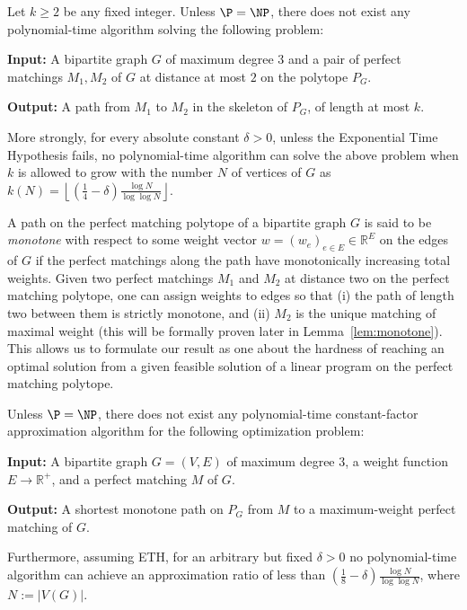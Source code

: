 \documentclass[runningheads]{llncs}
\begin{document}
\begin{theorem}
  \label{thm:approxdistanceishard}
  Let $k \ge 2$ be any fixed integer.
  Unless $\P=\NP$, there does not exist any polynomial-time algorithm solving the following problem: 
  \begin{description}
  \item{\textbf{Input:}} A bipartite graph $G$ of maximum degree $3$ and a pair of perfect matchings $M_1, M_2$ of $G$ at distance at most $2$ on the polytope $P_G$.
  \item{\textbf{Output:}} A path from $M_1$ to $M_2$ in the skeleton of $P_G$, of length at most $k$.
  \end{description}

More strongly, for every absolute constant $\delta>0$, unless the Exponential Time Hypothesis fails, no polynomial-time algorithm can solve the above problem when $k$ is allowed to grow with the number $N$ of vertices of $G$ as $k(N)=\left\lfloor \left(\frac{1}{4}-\delta\right)\frac{\log N}{\log \log N} \right\rfloor$. 
\end{theorem}

A path on the perfect matching polytope of a bipartite graph $G$ is said to be \emph{monotone} with respect to some weight vector $w=(w_e)_{e \in E} \in \mathbb{R}^E$ on the edges of $G$ if the perfect matchings along the path have monotonically increasing total weights. Given two perfect matchings $M_1$ and $M_2$ at distance two on the perfect matching polytope, one can assign weights to edges so that (i) the path of length two between them is strictly monotone, and (ii) $M_2$ is the unique matching of maximal weight (this will be formally proven later in Lemma~\ref{lem:monotone}). This allows us to formulate our result as one about the hardness of reaching an optimal solution from a given feasible solution of a linear program on the perfect matching polytope.

\begin{corollary}
  \label{cor:monotone}
  Unless $\P=\NP$, there does not exist any polynomial-time constant-factor approximation algorithm for the following optimization problem: 
\begin{description}
\item{\textbf{Input:}} A bipartite graph $G=(V,E)$ of maximum degree $3$, a weight function $E\to\mathbb{R}^+$, and a perfect matching $M$ of $G$.
\item{\textbf{Output:}} A shortest monotone path on $P_G$ from $M$ to a maximum-weight perfect matching of $G$.
\end{description}

 Furthermore, assuming ETH, for an arbitrary but fixed $\delta>0$ no polynomial-time algorithm can achieve an approximation ratio of less than $\left(\frac{1}{8}-\delta\right)\frac{\log N}{\log \log N}$, where $N:=|V(G)|$. 
\end{corollary}
\end{document}
